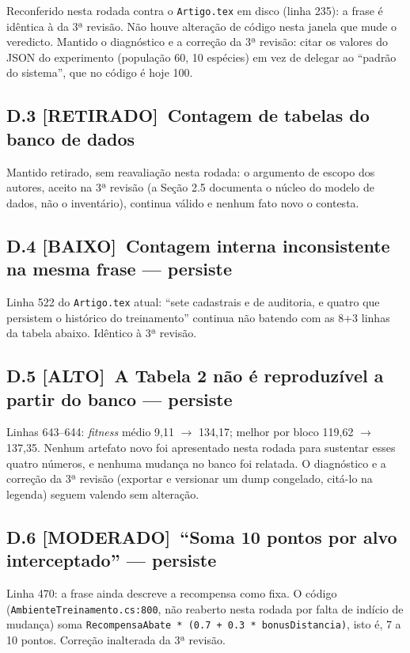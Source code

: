 \documentclass[11pt,a4paper]{article}
\newcommand{\alto}{\textbf{\color{orange!70!black}[ALTO]}}
\newcommand{\moderado}{\textbf{\color{blue!50!black}[MODERADO]}}
\newcommand{\baixo}{\textbf{\color{gray}[BAIXO]}}
\newcommand{\retirado}{\textbf{[RETIRADO]}}
\begin{document}
Reconferido nesta rodada contra o \texttt{Artigo.tex} em disco (linha 235): a frase é idêntica à da
3ª revisão. Não houve alteração de código nesta janela que mude o veredicto. Mantido o diagnóstico e a
correção da 3ª revisão: citar os valores do JSON do experimento (população 60, 10 espécies) em vez de
delegar ao ``padrão do sistema'', que no código é hoje 100.

\subsection*{D.3 \retirado\ Contagem de tabelas do banco de dados}

Mantido retirado, sem reavaliação nesta rodada: o argumento de escopo dos autores, aceito na 3ª
revisão (a Seção 2.5 documenta o núcleo do modelo de dados, não o inventário), continua válido e
nenhum fato novo o contesta.

\subsection*{D.4 \baixo\ Contagem interna inconsistente na mesma frase --- persiste}

Linha 522 do \texttt{Artigo.tex} atual: ``sete cadastrais e de auditoria, e quatro que persistem o
histórico do treinamento'' continua não batendo com as 8+3 linhas da tabela abaixo. Idêntico à 3ª
revisão.

\subsection*{D.5 \alto\ A Tabela 2 não é reproduzível a partir do banco --- persiste}

Linhas 643--644: \textit{fitness} médio 9,11 $\to$ 134,17; melhor por bloco 119,62 $\to$ 137,35.
Nenhum artefato novo foi apresentado nesta rodada para sustentar esses quatro números, e nenhuma
mudança no banco foi relatada. O diagnóstico e a correção da 3ª revisão (exportar e versionar um dump
congelado, citá-lo na legenda) seguem valendo sem alteração.

\subsection*{D.6 \moderado\ ``Soma 10 pontos por alvo interceptado'' --- persiste}

Linha 470: a frase ainda descreve a recompensa como fixa. O código
(\texttt{AmbienteTreinamento.cs:800}, não reaberto nesta rodada por falta de indício de mudança)
soma \texttt{RecompensaAbate * (0.7 + 0.3 * bonusDistancia)}, isto é, 7 a 10 pontos. Correção
inalterada da 3ª revisão.
\end{document}
